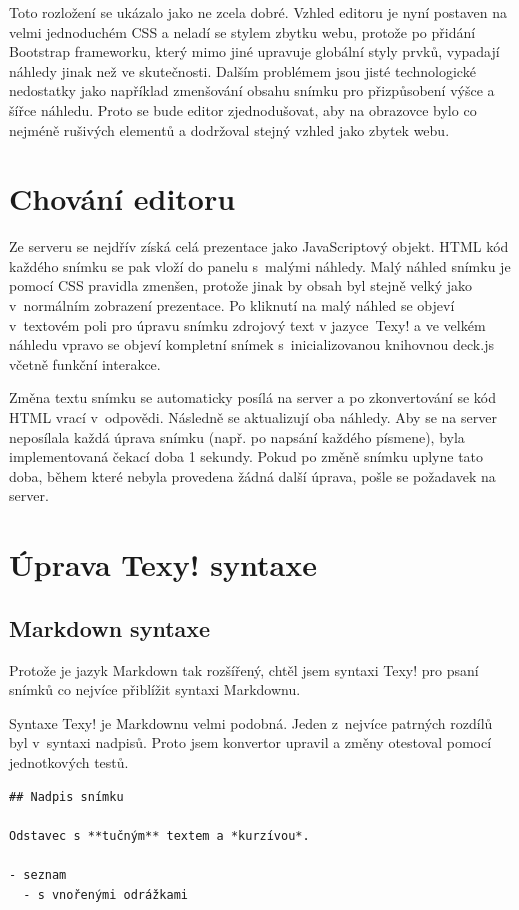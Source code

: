 \documentclass[11pt,twoside,a4paper]{book}
\begin{document}
Toto rozložení se ukázalo jako ne zcela dobré. Vzhled editoru je nyní postaven na velmi jednoduchém CSS a neladí se
stylem zbytku webu, protože po přidání Bootstrap frameworku, který mimo jiné upravuje globální styly prvků, vypadají
náhledy jinak než ve skutečnosti. Dalším problémem jsou jisté technologické nedostatky jako například zmenšování obsahu
snímku pro přizpůsobení výšce a šířce náhledu. Proto se bude editor zjednodušovat, aby na obrazovce bylo co nejméně
rušivých elementů a dodržoval stejný vzhled jako zbytek webu.


\section[Chování editoru]{Chování editoru}
Ze serveru se nejdřív získá celá prezentace jako JavaScriptový objekt. HTML kód každého snímku se pak vloží do panelu
s~malými náhledy. Malý náhled snímku je pomocí CSS pravidla zmenšen, protože jinak by obsah byl stejně velký jako
v~normálním zobrazení prezentace. Po kliknutí na malý náhled se objeví v~textovém poli pro úpravu snímku zdrojový text
v jazyce~Texy! a ve velkém náhledu vpravo se objeví kompletní snímek s~inicializovanou knihovnou deck.js včetně funkční
interakce.

Změna textu snímku se automaticky posílá na server a po zkonvertování se kód HTML vrací v~odpovědi. Následně se
aktualizují oba náhledy. Aby se na server neposílala každá úprava snímku (např. po napsání každého písmene), byla
implementovaná čekací doba 1 sekundy. Pokud po změně snímku uplyne tato doba, během které nebyla provedena žádná další
úprava, pošle se požadavek na server.


\section{Úprava Texy! syntaxe}

\subsection{Markdown syntaxe}
Protože je jazyk Markdown tak rozšířený, chtěl jsem syntaxi Texy! pro psaní snímků co nejvíce přiblížit syntaxi
Markdownu.

Syntaxe Texy! je Markdownu velmi podobná. Jeden z~nejvíce patrných rozdílů byl v~syntaxi nadpisů. Proto jsem konvertor
upravil a změny otestoval pomocí jednotkových testů.

\begin{lstlisting}[caption=Ukázka syntaxe]
## Nadpis snímku

Odstavec s **tučným** textem a *kurzívou*.

- seznam
  - s vnořenými odrážkami
\end{lstlisting}
\end{document}
